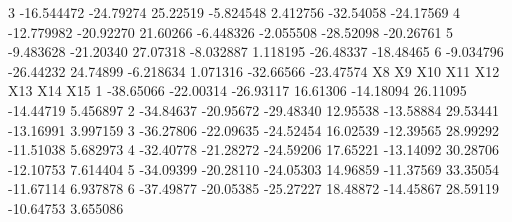 \documentclass[
]{article}
\newenvironment{Shaded}{\begin{snugshade}}{\end{snugshade}}
\newcommand{\DecValTok}[1]{\textcolor[rgb]{0.00,0.00,0.81}{#1}}
\newcommand{\FloatTok}[1]{\textcolor[rgb]{0.00,0.00,0.81}{#1}}
\newcommand{\NormalTok}[1]{#1}
\newcommand{\SpecialCharTok}[1]{\textcolor[rgb]{0.00,0.00,0.00}{#1}}
\begin{document}
\begin{Shaded}
\begin{Highlighting}[]
\DecValTok{3} \SpecialCharTok{{-}}\FloatTok{16.544472} \SpecialCharTok{{-}}\FloatTok{24.79274} \FloatTok{25.22519} \SpecialCharTok{{-}}\FloatTok{5.824548}  \FloatTok{2.412756} \SpecialCharTok{{-}}\FloatTok{32.54058} \SpecialCharTok{{-}}\FloatTok{24.17569}
\DecValTok{4} \SpecialCharTok{{-}}\FloatTok{12.779982} \SpecialCharTok{{-}}\FloatTok{20.92270} \FloatTok{21.60266} \SpecialCharTok{{-}}\FloatTok{6.448326} \SpecialCharTok{{-}}\FloatTok{2.055508} \SpecialCharTok{{-}}\FloatTok{28.52098} \SpecialCharTok{{-}}\FloatTok{20.26761}
\DecValTok{5}  \SpecialCharTok{{-}}\FloatTok{9.483628} \SpecialCharTok{{-}}\FloatTok{21.20340} \FloatTok{27.07318} \SpecialCharTok{{-}}\FloatTok{8.032887}  \FloatTok{1.118195} \SpecialCharTok{{-}}\FloatTok{26.48337} \SpecialCharTok{{-}}\FloatTok{18.48465}
\DecValTok{6}  \SpecialCharTok{{-}}\FloatTok{9.034796} \SpecialCharTok{{-}}\FloatTok{26.44232} \FloatTok{24.74899} \SpecialCharTok{{-}}\FloatTok{6.218634}  \FloatTok{1.071316} \SpecialCharTok{{-}}\FloatTok{32.66566} \SpecialCharTok{{-}}\FloatTok{23.47574}
\NormalTok{         X8        X9       X10      X11       X12      X13       X14      X15}
\DecValTok{1} \SpecialCharTok{{-}}\FloatTok{38.65066} \SpecialCharTok{{-}}\FloatTok{22.00314} \SpecialCharTok{{-}}\FloatTok{26.93117} \FloatTok{16.61306} \SpecialCharTok{{-}}\FloatTok{14.18094} \FloatTok{26.11095} \SpecialCharTok{{-}}\FloatTok{14.44719} \FloatTok{5.456897}
\DecValTok{2} \SpecialCharTok{{-}}\FloatTok{34.84637} \SpecialCharTok{{-}}\FloatTok{20.95672} \SpecialCharTok{{-}}\FloatTok{29.48340} \FloatTok{12.95538} \SpecialCharTok{{-}}\FloatTok{13.58884} \FloatTok{29.53441} \SpecialCharTok{{-}}\FloatTok{13.16991} \FloatTok{3.997159}
\DecValTok{3} \SpecialCharTok{{-}}\FloatTok{36.27806} \SpecialCharTok{{-}}\FloatTok{22.09635} \SpecialCharTok{{-}}\FloatTok{24.52454} \FloatTok{16.02539} \SpecialCharTok{{-}}\FloatTok{12.39565} \FloatTok{28.99292} \SpecialCharTok{{-}}\FloatTok{11.51038} \FloatTok{5.682973}
\DecValTok{4} \SpecialCharTok{{-}}\FloatTok{32.40778} \SpecialCharTok{{-}}\FloatTok{21.28272} \SpecialCharTok{{-}}\FloatTok{24.59206} \FloatTok{17.65221} \SpecialCharTok{{-}}\FloatTok{13.14092} \FloatTok{30.28706} \SpecialCharTok{{-}}\FloatTok{12.10753} \FloatTok{7.614404}
\DecValTok{5} \SpecialCharTok{{-}}\FloatTok{34.09399} \SpecialCharTok{{-}}\FloatTok{20.28110} \SpecialCharTok{{-}}\FloatTok{24.05303} \FloatTok{14.96859} \SpecialCharTok{{-}}\FloatTok{11.37569} \FloatTok{33.35054} \SpecialCharTok{{-}}\FloatTok{11.67114} \FloatTok{6.937878}
\DecValTok{6} \SpecialCharTok{{-}}\FloatTok{37.49877} \SpecialCharTok{{-}}\FloatTok{20.05385} \SpecialCharTok{{-}}\FloatTok{25.27227} \FloatTok{18.48872} \SpecialCharTok{{-}}\FloatTok{14.45867} \FloatTok{28.59119} \SpecialCharTok{{-}}\FloatTok{10.64753} \FloatTok{3.655086}

\end{Highlighting}
\end{Shaded}
\end{document}

